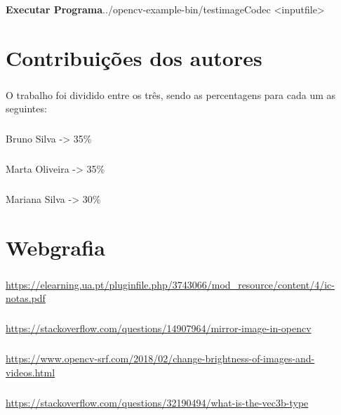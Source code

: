 \documentclass{report}
\begin{document}
\paragraph{}

\textbf{Executar Programa}../opencv-example-bin/test\textunderscore imageCodec <inputfile>

\chapter*{Contribuições dos autores}
\paragraph{}
O trabalho foi dividido entre os três, sendo as percentagens para cada um as seguintes:
\paragraph{}
Bruno Silva -> 35\%
\paragraph{}
Marta Oliveira -> 35\%
\paragraph{}
Mariana Silva -> 30\%

\chapter*{Webgrafia}

\paragraph{}
\url{https://elearning.ua.pt/pluginfile.php/3743066/mod_resource/content/4/ic-notas.pdf}
\paragraph{}
\url{https://stackoverflow.com/questions/14907964/mirror-image-in-opencv}
\paragraph{}
\url{https://www.opencv-srf.com/2018/02/change-brightness-of-images-and-videos.html}
\paragraph{}
\url{https://stackoverflow.com/questions/32190494/what-is-the-vec3b-type}

\end{document}
